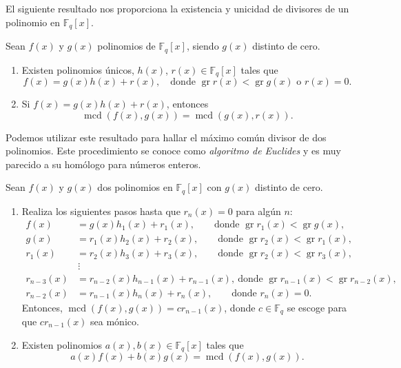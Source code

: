 El siguiente resultado nos proporciona la existencia y unicidad de divisores de un polinomio en \(\mathbb F_q[x]\).


\begin{theorem}
  \label{th:algoritmo-division}
  Sean \(f(x)\) y \(g(x)\) polinomios de \(\mathbb F_q[x]\), siendo \(g(x)\) distinto de cero.
  \begin{enumerate}
    \item \label{thi:algoritmo-division-division} Existen polinomios únicos, \(h(x)\), \(r(x) \in \mathbb F_q[x]\) tales que \[
      f(x) = g(x)h(x) + r(x), \quad \text{donde } \operatorname{gr} r(x) < \operatorname{gr} g(x) \text{ o } r(x) = 0. 
    \]
    \item \label{thi:algoritmo-division-mcd} Si \(f(x) = g(x)h(x) + r(x)\), entonces \[\operatorname{mcd}(f(x), g(x)) = \operatorname{mcd}(g(x), r(x)).\]
  \end{enumerate}
\end{theorem}

Podemos utilizar este resultado para hallar el máximo común divisor de dos polinomios.
Este procedimiento se conoce como \textit{algoritmo de Euclides} y es muy parecido a su homólogo para números enteros.

\begin{theorem}
  Sean \(f(x)\) y \(g(x)\) dos polinomios en \(\mathbb F_q[x]\) con \(g(x)\) distinto de cero.
  \begin{enumerate}
    \item Realiza los siguientes pasos hasta que \(r_n(x) = 0\) para algún \(n\):
    \begin{align*}
      f(x) &= g(x)h_1(x) + r_1(x), \qquad \text{donde } \operatorname{gr} r_1(x) < \operatorname{gr} g(x),\\
      g(x) &= r_1(x)h_2(x) + r_2(x), \qquad \text{donde } \operatorname{gr} r_2(x) < \operatorname{gr} r_1(x),\\
      r_1(x) &= r_2(x)h_3(x) + r_3(x), \qquad \text{donde } \operatorname{gr} r_2(x) < \operatorname{gr} r_3(x),\\
        &\,\vdots \\
      r_{n-3}(x) &= r_{n-2}(x)h_{n-1}(x) + r_{n-1}(x), \ \text{donde } \operatorname{gr} r_{n-1}(x) < \operatorname{gr} r_{n-2}(x),\\
      r_{n-2}(x) &= r_{n-1}(x)h_n(x) + r_n(x), \qquad \text{donde } r_n(x) = 0.
    \end{align*} 
    Entonces, \(\operatorname{mcd}(f(x), g(x)) = cr_{n-1}(x)\), donde \(c \in \mathbb F_q\) se escoge para que \(cr_{n-1}(x)\) sea mónico.
    \item Existen polinomios \(a(x), b(x) \in \mathbb F_q[x]\) tales que 
    \[
      a(x)f(x) + b(x)g(x) = \operatorname{mcd}(f(x), g(x)).
    \]
  \end{enumerate}
  \label{th:algoritmo-euclides}
\end{theorem}

